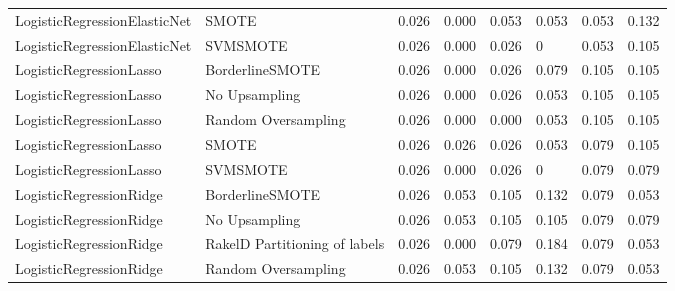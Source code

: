 \begin{tabular}{llllllll}
   LogisticRegressionElasticNet &                         SMOTE & 0.026 &                     0.000 &                 0.053 &                  0.053 &                                   0.053 &    0.132 \\
   LogisticRegressionElasticNet &                      SVMSMOTE & 0.026 &                     0.000 &                 0.026 &                      0 &                                   0.053 &    0.105 \\
        LogisticRegressionLasso &               BorderlineSMOTE & 0.026 &                     0.000 &                 0.026 &                  0.079 &                                   0.105 &    0.105 \\
        LogisticRegressionLasso &                 No Upsampling & 0.026 &                     0.000 &                 0.026 &                  0.053 &                                   0.105 &    0.105 \\
        LogisticRegressionLasso &           Random Oversampling & 0.026 &                     0.000 &                 0.000 &                  0.053 &                                   0.105 &    0.105 \\
        LogisticRegressionLasso &                         SMOTE & 0.026 &                     0.026 &                 0.026 &                  0.053 &                                   0.079 &    0.105 \\
        LogisticRegressionLasso &                      SVMSMOTE & 0.026 &                     0.000 &                 0.026 &                      0 &                                   0.079 &    0.079 \\
        LogisticRegressionRidge &               BorderlineSMOTE & 0.026 &                     0.053 &                 0.105 &                  0.132 &                                   0.079 &    0.053 \\
        LogisticRegressionRidge &                 No Upsampling & 0.026 &                     0.053 &                 0.105 &                  0.105 &                                   0.079 &    0.079 \\
        LogisticRegressionRidge & RakelD Partitioning of labels & 0.026 &                     0.000 &                 0.079 &                  0.184 &                                   0.079 &    0.053 \\
        LogisticRegressionRidge &           Random Oversampling & 0.026 &                     0.053 &                 0.105 &                  0.132 &                                   0.079 &    0.053 \\

\end{tabular}
